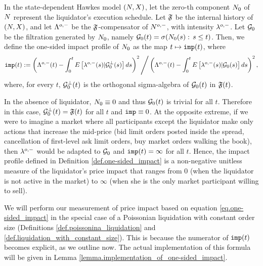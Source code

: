 \documentclass[10pt, article,table]{article}
\begin{document}
\begin{defi}\label{def.one-sided_impact}
 In the state-dependent Hawkes model $\sdHawkesPair$, let the zero-th component $\countingProc[0]$ of $\multiCountingProc$ represent the liquidator's execution schedule. Let $\internalHistory$ be the internal history of $\sdHawkesPair$, and let $\weakDeflCompensator$ be the $\internalHistory$-compensator of $\weakDeflPP$, with intensity $\weakDeflIntensity$. Let $\liquidatorSigmaAlgebra$ be the filtration generated by $\countingProc[0]$, namely $\liquidatorSigmaAlgebra(t) = \sigma(\countingProc[0](s): \, s\leq t)$. Then, we define the one-sided impact profile of  $\countingProc[0]$ as the map $t\mapsto \impactProfile(t)$, where
 \begin{equation}\label{eq.one-sided_impact}
  \impactProfile(t):=
  \left(\weakDeflCompensator(t) 
    - \intzerot\Expectation\left[\weakDeflIntensity(s)\vert \liquidatorSigmaAlgebra\orthogonal(s)\right]ds \right)\squared
    \Bigg/
      \left(\weakDeflCompensator(t) 
    - \intzerot\Expectation\left[\weakDeflIntensity(s)\vert \liquidatorSigmaAlgebra(s)\right]ds \right)\squared, 
 \end{equation}
 where, for every $t$,  $\liquidatorSigmaAlgebra\orthogonal(t)$ is the orthogonal sigma-algebra of $\liquidatorSigmaAlgebra(t)$ in $\internalHistory(t)$.
\end{defi}

In the absence of liquidator, $\countingProc[0] \equiv 0$ and thus $\sigmaAlgebraG_0(t)$ is trivial for all $t$. Therefore in this case, $\sigmaAlgebraG_{0}\orthogonal(t) = \internalHistory(t)$ for all $t$ and $\impactProfile \equiv 0$. 
At the opposite extreme, if we were to imagine a market where all participants except the liquidator make only actions that increase the mid-price (bid limit orders posted inside the spread, cancellation of first-level ask limit orders, buy market orders walking the book), then $\weakDeflIntensity$ would be adapted to $\sigmaAlgebraG_0$ and $\impactProfile(t)=\infty$ for all $t$. Hence, the impact profile defined in Definition \ref{def.one-sided_impact} is a non-negative unitless measure of the liquidator's price impact that ranges from $0$ (when the liquidator is not active in the market) to $\infty$ (when she is the only market participant willing to sell). 

We will perform our measurement of price impact based on equation \eqref{eq.one-sided_impact} in the special case of a Poissonian liquidation with constant order size (Definitions \ref{def.poissonina_liquidation} and \ref{def.liquidation_with_constant_size}). This is because the numerator of $\impactProfile(t)$ becomes explicit, as we outline now. The actual implementation of this formula will be given in Lemma \ref{lemma.implementation_of_one-sided_impact}.
\end{document}

